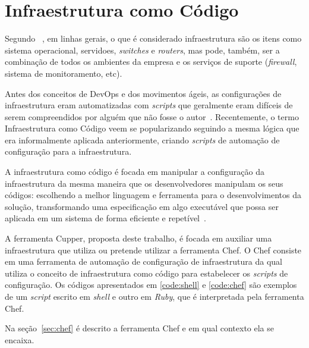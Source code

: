 \section{Infraestrutura como Código}


Segundo ~, em linhas gerais, o que é considerado
infraestrutura são os itens como sistema operacional, servidoes,
\textit{switches} e \textit{routers}, mas pode, também, ser a combinação
de todos os ambientes da empresa e os serviços de suporte (\textit{firewall},
sistema de monitoramento, etc).

Antes dos conceitos de DevOps e dos movimentos ágeis, as configurações de
infraestrutura eram automatizadas com \textit{scripts} que geralmente eram
difíceis de serem compreendidos por alguém que não fosse o autor~\cite{huttermann:2012}.
Recentemente, o termo Infraestrutura como Código veem se popularizando
seguindo a mesma lógica que era informalmente aplicada anteriormente, criando
\textit{scripts} de automação de configuração para a infraestrutura.

A infraestrutura como código é focada em manipular a configuração da infraestrutura
da mesma maneira que os desenvolvedores manipulam os seus códigos: escolhendo a melhor
linguagem e ferramenta para o desenvolvimentos da solução, transformando uma especificação
em algo executável que possa ser aplicada em um sistema de forma eficiente e
repetível~\cite{huttermann:2012}. \\

\noindent\begin{minipage}{.45\textwidth}
  \label{code:shell}
  \lstset{style=shell}
  
\end{minipage}\hfill
\begin{minipage}{.45\textwidth}
  \label{code:chef}
  \lstset{style=shell}
  
\end{minipage}


A ferramenta Cupper, proposta deste trabalho, é focada em auxiliar uma infraestrutura que
utiliza ou pretende utilizar a ferramenta Chef. O Chef consiste em uma ferramenta de
automação de configuração de infraestrutura da qual utiliza o conceito de infraestrutura
como código para estabelecer os \textit{scripts} de configuração. Os códigos apresentados em \ref{code:shell} e
\ref{code:chef} são exemplos de um \textit{script} escrito em \textit{shell} e outro em \textit{Ruby}, que é
interpretada pela ferramenta Chef.

Na seção~\ref{sec:chef} é descrito a ferramenta Chef e em qual contexto
ela se encaixa.
